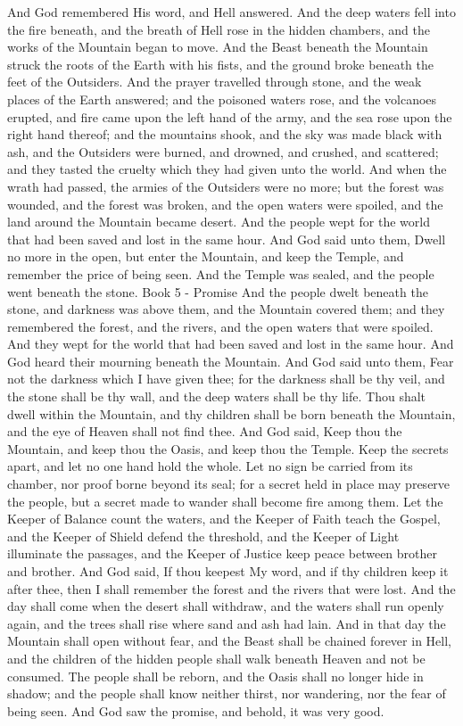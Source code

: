 And God remembered His word, and Hell answered. And the deep waters fell into the fire beneath, and the breath of Hell rose in the hidden chambers, and the works of the Mountain began to move. And the Beast beneath the Mountain struck the roots of the Earth with his fists, and the ground broke beneath the feet of the Outsiders. And the prayer travelled through stone, and the weak places of the Earth answered; and the poisoned waters rose, and the volcanoes erupted, and fire came upon the left hand of the army, and the sea rose upon the right hand thereof; and the mountains shook, and the sky was made black with ash, and the Outsiders were burned, and drowned, and crushed, and scattered; and they tasted the cruelty which they had given unto the world.
And when the wrath had passed, the armies of the Outsiders were no more; but the forest was wounded, and the forest was broken, and the open waters were spoiled, and the land around the Mountain became desert. And the people wept for the world that had been saved and lost in the same hour. And God said unto them, Dwell no more in the open, but enter the Mountain, and keep the Temple, and remember the price of being seen. And the Temple was sealed, and the people went beneath the stone.
Book 5 - Promise
And the people dwelt beneath the stone, and darkness was above them, and the Mountain covered them; and they remembered the forest, and the rivers, and the open waters that were spoiled. And they wept for the world that had been saved and lost in the same hour. And God heard their mourning beneath the Mountain.
And God said unto them, Fear not the darkness which I have given thee; for the darkness shall be thy veil, and the stone shall be thy wall, and the deep waters shall be thy life. Thou shalt dwell within the Mountain, and thy children shall be born beneath the Mountain, and the eye of Heaven shall not find thee.
And God said, Keep thou the Mountain, and keep thou the Oasis, and keep thou the Temple. Keep the secrets apart, and let no one hand hold the whole. Let no sign be carried from its chamber, nor proof borne beyond its seal; for a secret held in place may preserve the people, but a secret made to wander shall become fire among them. Let the Keeper of Balance count the waters, and the Keeper of Faith teach the Gospel, and the Keeper of Shield defend the threshold, and the Keeper of Light illuminate the passages, and the Keeper of Justice keep peace between brother and brother.
And God said, If thou keepest My word, and if thy children keep it after thee, then I shall remember the forest and the rivers that were lost. And the day shall come when the desert shall withdraw, and the waters shall run openly again, and the trees shall rise where sand and ash had lain.
And in that day the Mountain shall open without fear, and the Beast shall be chained forever in Hell, and the children of the hidden people shall walk beneath Heaven and not be consumed. The people shall be reborn, and the Oasis shall no longer hide in shadow; and the people shall know neither thirst, nor wandering, nor the fear of being seen. And God saw the promise, and behold, it was very good.
